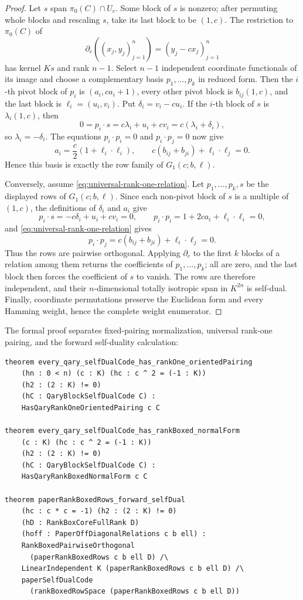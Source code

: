 \documentclass[12pt]{article}
\begin{document}
\begin{proof}
Let \(s\) span \(\pi_0(C)\cap U_c\).  Some block of \(s\) is nonzero;
after permuting whole blocks and rescaling \(s\), take its last block to be
\((1,c)\).  The restriction to \(\pi_0(C)\) of
\[
\partial_c((x_j,y_j)_{j=1}^n)=(y_j-cx_j)_{j=1}^n
\]
has kernel \(Ks\) and rank \(n-1\).  Select \(n-1\) independent coordinate
functionals of its image and choose a complementary basis
\(p_1,\ldots,p_k\) in reduced form.  Then the \(i\)-th pivot block of
\(p_i\) is \((a_i,ca_i+1)\), every other pivot block is
\(b_{ij}(1,c)\), and the last block is \(\ell_i=(u_i,v_i)\).  Put
\(\delta_i=v_i-cu_i\).  If the \(i\)-th block of \(s\) is
\(\lambda_i(1,c)\), then
\[
0=p_i\cdot s=c\lambda_i+u_i+cv_i
=c(\lambda_i+\delta_i),
\]
so \(\lambda_i=-\delta_i\).  The equations \(p_i\cdot p_i=0\) and
\(p_i\cdot p_j=0\) now give
\[
a_i=\frac c2(1+\ell_i\cdot\ell_i),
\qquad
c(b_{ij}+b_{ji})+\ell_i\cdot\ell_j=0.
\]
Hence this basis is exactly the row family of \(G_1(c;b,\ell)\).

Conversely, assume \eqref{eq:universal-rank-one-relation}.  Let
\(p_1,\ldots,p_k,s\) be the displayed rows of \(G_1(c;b,\ell)\).  Since
each non-pivot block of \(s\) is a multiple of \((1,c)\), the definitions of
\(\delta_i\) and \(a_i\) give
\[
p_i\cdot s=-c\delta_i+u_i+cv_i=0,
\qquad
p_i\cdot p_i=1+2ca_i+\ell_i\cdot\ell_i=0,
\]
and \eqref{eq:universal-rank-one-relation} gives
\[
p_i\cdot p_j=c(b_{ij}+b_{ji})+\ell_i\cdot\ell_j=0.
\]
Thus the rows are pairwise orthogonal.  Applying \(\partial_c\) to the
first \(k\) blocks of a relation among them returns the coefficients of
\(p_1,\ldots,p_k\); all are zero, and the last block then forces the
coefficient of \(s\) to vanish.  The rows are therefore independent, and
their \(n\)-dimensional totally isotropic span in \(K^{2n}\) is self-dual.
Finally, coordinate permutations preserve the Euclidean form and every
Hamming weight, hence the complete weight enumerator.
\end{proof}

\noindent
The formal proof separates fixed-pairing normalization, universal rank-one
pairing, and the forward self-duality calculation:
\begin{lstlisting}[caption={Lean goals for Theorems~\ref{thm:qary-universal-rank-r} and~\ref{thm:qary-universal-rank-one}.}]
theorem every_qary_selfDualCode_has_rankOne_orientedPairing
    (hn : 0 < n) (c : K) (hc : c ^ 2 = (-1 : K))
    (h2 : (2 : K) != 0)
    (hC : QaryBlockSelfDualCode C) :
    HasQaryRankOneOrientedPairing c C

theorem every_qary_selfDualCode_has_rankBoxed_normalForm
    (c : K) (hc : c ^ 2 = (-1 : K))
    (h2 : (2 : K) != 0)
    (hC : QaryBlockSelfDualCode C) :
    HasQaryRankBoxedNormalForm c C

theorem paperRankBoxedRows_forward_selfDual
    (hc : c * c = -1) (h2 : (2 : K) != 0)
    (hD : RankBoxCoreFullRank D)
    (hoff : PaperOffDiagonalRelations c b ell) :
    RankBoxedPairwiseOrthogonal
      (paperRankBoxedRows c b ell D) /\
    LinearIndependent K (paperRankBoxedRows c b ell D) /\
    paperSelfDualCode
      (rankBoxedRowSpace (paperRankBoxedRows c b ell D))
\end{lstlisting}
\end{document}
